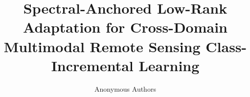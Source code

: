 \documentclass[journal]{IEEEtran}
\begin{document}
\title{Spectral-Anchored Low-Rank Adaptation for Cross-Domain Multimodal Remote Sensing Class-Incremental Learning}

\author{Anonymous Authors}

\maketitle












\end{document}
